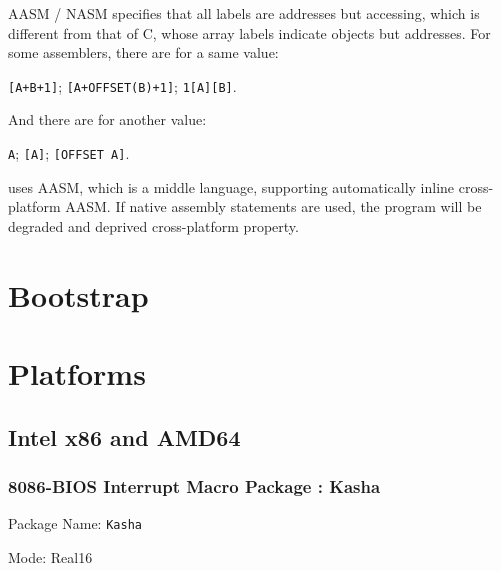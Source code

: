 AASM / NASM specifies that all labels are addresses but accessing, which is different from that of C, whose array labels indicate objects but addresses. For some assemblers, there are for a same value:

\verb|[A+B+1]|; \verb|[A+OFFSET(B)+1]|; \verb|1[A][B]|.

And there are for another value:

\verb|A|; \verb|[A]|; \verb|[OFFSET A]|.

 uses AASM, which is a middle language, supporting automatically inline cross-platform AASM. If native assembly statements are used, the program will be degraded and deprived cross-platform property.



\section{Bootstrap}





\section{Platforms}



\subsection{Intel x86 and AMD64}



\subsubsection{8086-BIOS Interrupt Macro Package : Kasha}

Package Name: \verb|Kasha|

Mode: Real16



